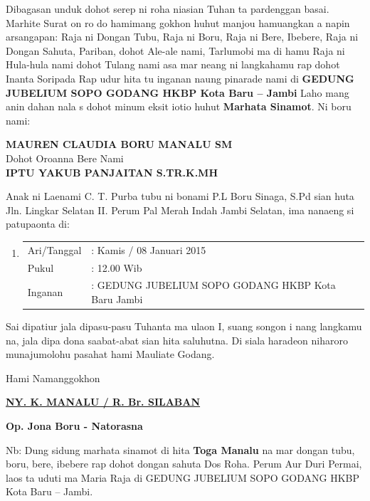 \documentclass[24pt]{article}
\begin{document}
\begin{center}
{\begin{minipage}{\dimexpr\textwidth-2\fboxsep-2\fboxrule}
\hspace{30pt}
Dibagasan unduk dohot serep ni roha niasian Tuhan ta pardenggan basai. Marhite Surat on ro do hamimang gokhon huhut manjou hamuangkan a napin arsangapan: Raja ni Dongan Tubu, Raja ni Boru, Raja ni Bere, Ibebere, Raja ni Dongan Sahuta, Pariban, dohot Ale-ale nami, Tarlumobi ma di hamu Raja ni Hula-hula nami dohot Tulang nami asa mar neang ni langkahamu rap dohot Inanta Soripada Rap udur hita tu inganan naung pinarade nami di
\textbf{GEDUNG JUBELIUM SOPO GODANG HKBP Kota Baru -- Jambi} Laho mang anin dahan nala s dohot minum eksit iotio huhut \textbf{Marhata Sinamot}. Ni boru nami:

\begin{center}
{\Large \textbf{\MakeUppercase{Mauren Claudia Boru Manalu SM}}}
\\[0.3cm]
\Large {Dohot Oroanna Bere Nami }
\\[0.3cm]
{\Large \textbf{\MakeUppercase{Iptu Yakub Panjaitan S.Tr.K.MH}}}
\end{center}

\vspace{0.1cm}
Anak ni Laenami C. T. Purba tubu ni bonami P.L Boru Sinaga, S.Pd sian huta Jln. Lingkar Selatan II. Perum Pal Merah Indah Jambi Selatan, ima nanaeng si patupaonta di:

\begin{enumerate}[label={}]
\item\begin{tabular}{ l l }
Ari/Tanggal & :  Kamis / 08 Januari 2015 \\
Pukul & :  12.00 Wib \\
Inganan& :  GEDUNG JUBELIUM SOPO GODANG HKBP Kota Baru Jambi \\
\end{tabular}
\end{enumerate}

\vspace{0.1cm}
Sai dipatiur jala dipasu-pasu Tuhanta ma ulaon I, suang songon i nang langkamu na, jala dipa dona saabat-abat sian hita saluhutna. Di siala haradeon niharoro munajumolohu pasahat hami Mauliate Godang.

\vspace{0.1cm}
\begin{center}
    

Hami Namanggokhon

\vspace{0.1cm}
\textbf{\uline{NY. K. MANALU / R. Br. SILABAN}}

\textbf{Op. Jona Boru - Natorasna}
\end{center}
\vspace{0.1cm}
Nb: Dung sidung marhata sinamot di hita \textbf{Toga Manalu} na mar dongan tubu, boru, bere, ibebere rap dohot dongan sahuta Dos Roha. Perum Aur Duri Permai, laos ta uduti ma Maria Raja di GEDUNG JUBELIUM SOPO GODANG HKBP Kota Baru -- Jambi.

\end{minipage}
}
\end{center}
\end{document}

